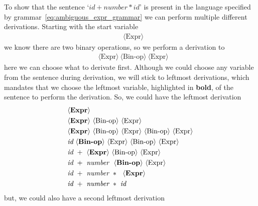 \documentclass[
    oneside,
    english,
    coorientadorbanca,
    embeddedlogo,
    noabntexcite
]{ufsc-thesis-rn46-2019}
\newcommand{\bnfvar}[1]{\ \bnfvars{#1}}
\newcommand{\bnfvars}[1]{\langle\textrm{#1}\rangle}
\begin{document}
To show that the sentence `$id + number * id$' is present in the language specified by grammar~\eqref{eq:ambiguous_expr_grammar} we can perform multiple different derivations. Starting with the start variable
\begin{equation*}
    \begin{aligned}
         & \bnfvars{Expr}
    \end{aligned}
\end{equation*}
we know there are two binary operations, so we perform a derivation to
\begin{equation*}
    \begin{aligned}
         & \bnfvars{Expr}\bnfvar{Bin-op}\bnfvar{Expr}
    \end{aligned}
\end{equation*}
here we can choose what to derivate first.
Although we could choose any variable from the sentence during derivation, we will stick to leftmost derivations, which mandates that we choose the leftmost variable, highlighted in \textbf{bold}, of the sentence to perform the derivation.
So, we could have the leftmost derivation
\begin{equation}\label{eq:ambiouous_derivation1}
    \begin{aligned}
         & \bnfvars{\textbf{Expr}}                                                         \\
         & \bnfvars{\textbf{Expr}}\bnfvar{Bin-op}\bnfvar{Expr}                             \\
         & \bnfvars{\textbf{Expr}}\bnfvar{Bin-op}\bnfvar{Expr}\bnfvar{Bin-op}\bnfvar{Expr} \\
         & \textit{id}\bnfvar{\textbf{Bin-op}}\bnfvar{Expr}\bnfvar{Bin-op}\bnfvar{Expr}    \\
         & \textit{id}\ + \bnfvar{\textbf{Expr}}\bnfvar{Bin-op}\bnfvar{Expr}               \\
         & \textit{id}\ + \ \textit{number} \ \bnfvar{\textbf{Bin-op}}\bnfvar{Expr}        \\
         & \textit{id}\ + \ \textit{number} \ * \ \bnfvar{\textbf{Expr}}                   \\
         & \textit{id}\ + \ \textit{number} \ * \ \textit{id}
    \end{aligned}
\end{equation}
but, we could also have a second leftmost derivation
\end{document}
